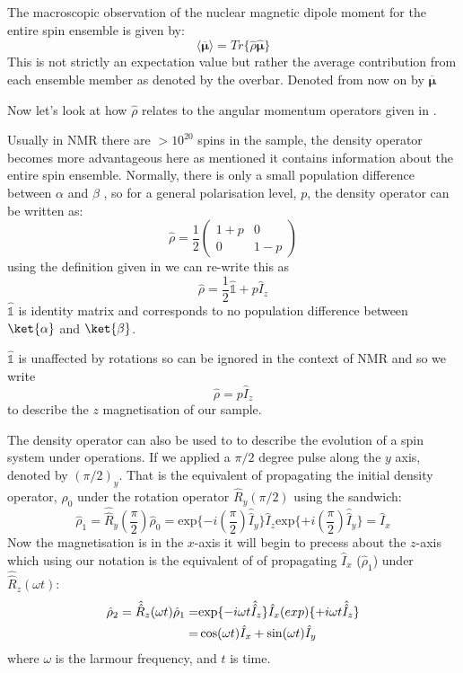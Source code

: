 The macroscopic observation of the nuclear magnetic dipole moment for the entire spin ensemble
is given by:
\begin{equation}
  \langle\overbar{\boldsymbol{\mu}}\rangle = Tr\{\hat{\rho}\hat{\boldsymbol{\mu}}\}
\end{equation}
This is not strictly an expectation value but rather the average contribution from each
ensemble member as denoted by the overbar. Denoted from now on by $\overbar{\boldsymbol{\mu}}$

Now let's look at how $\hat\rho$ relates to the angular momentum operators given in .

Usually in NMR there are $>10^{20}$ spins in the sample, the density operator becomes more advantageous here
as mentioned it contains information about the entire spin ensemble. Normally, there is only a small population difference between $\alpha$ and $\beta$ ,
so for a general polarisation level, $p$, the density operator can be written as:
\begin{equation}
  \hat\rho = \frac{1}{2}\begin{pmatrix}
    1 + p & 0\\
    0 & 1 - p
\end{pmatrix}
\end{equation}
using the definition given in  we can re-write this as
\begin{equation}
  \hat\rho = \frac{1}{2}\hat{\mathbb{1}} + p\hat{I}_z
\end{equation}
$\hat{\mathbb{1}}$ is identity matrix and corresponds to no population difference between $\ket{\alpha}$ and $\ket{\beta}$.

$\hat{\mathbb{1}}$ is unaffected by rotations so can be ignored in the context of NMR
and so we write
\begin{equation}
  \hat{\rho} = p\hat{I}_z
\end{equation}
to describe the $z$ magnetisation of our sample.

The density operator can also be used to to describe the evolution of a spin system under operations. If we applied a $\pi/2$ degree pulse along the $y$ axis, denoted by $(\pi/2)_y$. That is the equivalent of propagating the initial density operator, $\rho_0$
under the rotation operator $\hat{R}_y(\pi/2)$ using the sandwich:
\begin{equation}
  \hat{\rho}_1 = \hat{\hat{R}}_y(\frac{\pi}{2})\hat\rho_0 = \text{exp}\{-i(\frac{\pi}{2})\hat{\hat{I}}_y\}\hat{I}_z\text{exp}\{+i(\frac{\pi}{2})\hat{\hat{I}}_y\} = \hat{I}_x
\end{equation}
Now the magnetisation is in the $x$-axis it will begin to precess about the $z$-axis which using our notation is the equivalent of of propagating $\hat{I}_x$ ($\hat{\rho}_1$)
under $\hat{\hat{R}}_z(\omega t)$:
\begin{align}\label{eqn:propagate}
  \hat{\rho}_2 = \hat{\hat{R}}_z(\omega t)\hat{\rho}_1 =& \text{exp}\{-i\omega t\hat{\hat{I}}_z\}\hat{I}_x\text(exp)\{+i\omega t\hat{\hat{I}}_z\}\\
   =& \cos(\omega t)\hat{I}_x + \sin(\omega t)\hat{I}_y
\end{align}
where $\omega$ is the larmour frequency, and $t$ is time.

